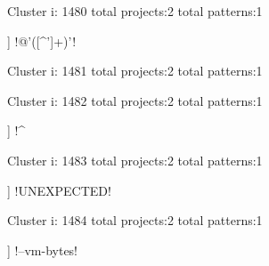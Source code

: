 Cluster i: 1480
total projects:2
total patterns:1
\begin{multicols}{1}
\begin{description}[noitemsep,topsep=0pt]
\item [[2] ] \cverb!@'([^']+)'!
\end{description}
\end{multicols}







Cluster i: 1481
total projects:2
total patterns:1
\begin{multicols}{1}
\begin{description}[noitemsep,topsep=0pt]
\item [[2] ] \cverb![$^#\\']!
\end{description}
\end{multicols}







Cluster i: 1482
total projects:2
total patterns:1
\begin{multicols}{1}
\begin{description}[noitemsep,topsep=0pt]
\item [[2] ] \cverb!^%
\end{description}
\end{multicols}







Cluster i: 1483
total projects:2
total patterns:1
\begin{multicols}{1}
\begin{description}[noitemsep,topsep=0pt]
\item [[2] ] \cverb!UNEXPECTED!
\end{description}
\end{multicols}







Cluster i: 1484
total projects:2
total patterns:1
\begin{multicols}{1}
\begin{description}[noitemsep,topsep=0pt]
\item [[2] ] \cverb!--vm-bytes!
\end{description}
\end{multicols}







